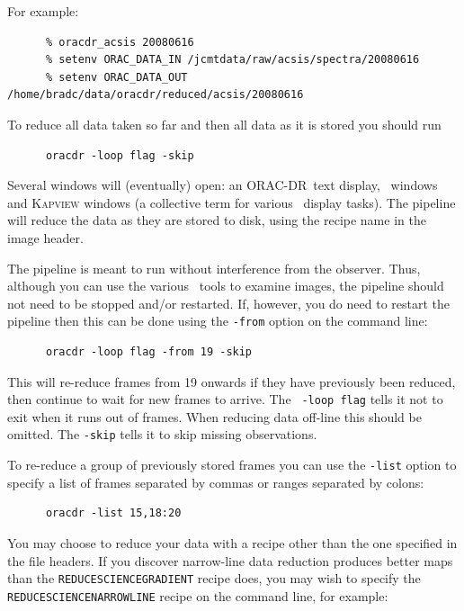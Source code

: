 \documentclass[twoside,11pt]{article}
\newcommand{\xref}[3]{#1}
\renewcommand{\_}{\texttt{\symbol{95}}}
\newcommand{\GAIA}{\xref{{\sc{Gaia}}}{sun214}{}}
\newcommand{\KAPPA}{\xref{{\sc{Kappa}}}{sun95}{}}
\newcommand{\ORACDR}{{\footnotesize ORAC-DR}}
\begin{document}
For example:

\begin{verbatim}
      % oracdr_acsis 20080616
      % setenv ORAC_DATA_IN /jcmtdata/raw/acsis/spectra/20080616
      % setenv ORAC_DATA_OUT /home/bradc/data/oracdr/reduced/acsis/20080616
\end{verbatim}

To reduce all data taken so far and then all data as it is stored you
should run 

\begin{verbatim}
      oracdr -loop flag -skip
\end{verbatim}

Several windows will (eventually) open: an \ORACDR\ text display, \GAIA\
windows and \textsc{Kapview} windows (a collective term for various
\KAPPA\ display tasks). The pipeline will reduce the data as they
are stored to disk, using the recipe name in the image header.

The pipeline is meant to run without interference from the observer.
Thus, although you can use the various \GAIA\ tools to examine images,
the pipeline should not need to be stopped and/or restarted. If,
however, you do need to restart the pipeline then this can be done
using the {\tt -from} option on the command line:

\begin{verbatim}
      oracdr -loop flag -from 19 -skip
\end{verbatim}

This will re-reduce frames from 19 onwards if they have previously
been reduced, then continue to wait for new frames to arrive. The {\tt
  -loop flag} tells it not to exit when it runs out of frames. When
reducing data off-line this should be omitted. The {\tt -skip} tells it to
skip missing observations.

To re-reduce a group of
previously stored frames you can use the {\tt -list} option to specify
a list of frames separated by commas or ranges separated by colons:

\begin{verbatim}
      oracdr -list 15,18:20
\end{verbatim}

You may choose to reduce your data with a recipe other than the one specified
in the file headers. If you discover narrow-line data reduction produces
better maps than the {\tt REDUCE\_SCIENCE\_GRADIENT} recipe does, you may wish
to specify the {\tt REDUCE\_SCIENCE\_NARROWLINE} recipe on the command line,
for example:
\end{document}
